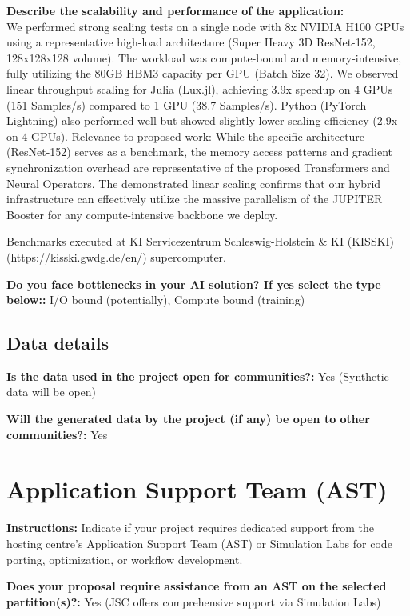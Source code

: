 \documentclass[12pt,a4paper]{article}
\begin{document}
\textbf{Describe the scalability and performance of the application:} \\
We performed strong scaling tests on a single node with 8x NVIDIA H100 GPUs using a representative high-load architecture (Super Heavy 3D ResNet-152, 128x128x128 volume). The workload was compute-bound and memory-intensive, fully utilizing the 80GB HBM3 capacity per GPU (Batch Size 32). We observed linear throughput scaling for Julia (Lux.jl), achieving 3.9x speedup on 4 GPUs (151 Samples/s) compared to 1 GPU (38.7 Samples/s). Python (PyTorch Lightning) also performed well but showed slightly lower scaling efficiency (2.9x on 4 GPUs).
Relevance to proposed work: While the specific architecture (ResNet-152) serves as a benchmark, the memory access patterns and gradient synchronization overhead are representative of the proposed Transformers and Neural Operators. The demonstrated linear scaling confirms that our hybrid infrastructure can effectively utilize the massive parallelism of the JUPITER Booster for any compute-intensive backbone we deploy.

Benchmarks executed at KI Servicezentrum Schleswig-Holstein \& KI (KISSKI) (https://kisski.gwdg.de/en/) supercomputer.

\textbf{Do you face bottlenecks in your AI solution? If yes select the type below::} I/O bound (potentially), Compute bound (training)

\subsection*{Data details}

\textbf{Is the data used in the project open for communities?:} Yes (Synthetic data will be open)

\textbf{Will the generated data by the project (if any) be open to other communities?:} Yes

\section*{Application Support Team (AST)}

\textbf{Instructions:} Indicate if your project requires dedicated support from the hosting centre's Application Support Team (AST) or Simulation Labs for code porting, optimization, or workflow development.

\textbf{Does your proposal require assistance from an AST on the selected partition(s)?:} Yes (JSC offers comprehensive support via Simulation Labs)
\end{document}
